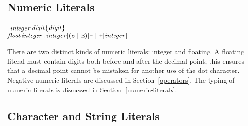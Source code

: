 \subsection{Numeric Literals}
\label{lexemes-numeric}

\begin{flushleft}\it\begin{tabbing}
\hspace{0.5in}\=\hspace{3.0in}\=\kill
$\it integer$\>\makebox[3.5em]{$\rightarrow$}$\it digit\{digit\}$\\ 
$\it float$\>\makebox[3.5em]{$\rightarrow$}$\it integer\makebox{\tt .}integer[(\makebox{\tt e}\ |\ \makebox{\tt E})[\makebox{\tt -}\ |\ \makebox{\tt +}]integer]$
\end{tabbing}\end{flushleft}
%
%
There are two distinct kinds of numeric literals: integer and
floating.  A floating literal must contain digits both before and
after the decimal point; this ensures that a decimal point cannot be
mistaken for another use of the dot character.  Negative numeric
literals are discussed in Section~\ref{operators}.  The typing of
numeric literals is discussed in Section~\ref{numeric-literals}.

\subsection{Character and String Literals}
\label{lexemes-char}

